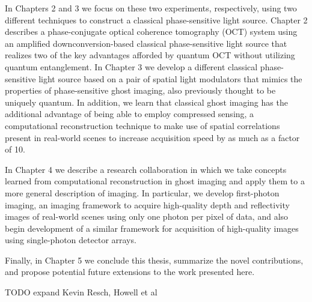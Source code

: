 In Chapters 2 and 3 we focus on these two experiments, respectively, using two different techniques to construct a classical phase-sensitive light source. Chapter 2 describes a phase-conjugate optical coherence tomography (OCT) system using an amplified downconversion-based classical phase-sensitive light source that realizes two of the key advantages afforded by quantum OCT without utilizing quantum entanglement. In Chapter 3 we develop a different classical phase-sensitive light source based on a pair of spatial light modulators that mimics the properties of phase-sensitive ghost imaging, also previously thought to be uniquely quantum. In addition, we learn that classical ghost imaging has the additional advantage of being able to employ compressed sensing, a computational reconstruction technique to make use of spatial correlations present in real-world scenes to increase acquisition speed by as much as a factor of 10.

In Chapter 4 we describe a research collaboration in which we take concepts learned from computational reconstruction in ghost imaging and apply them to a more general description of imaging. In particular, we develop first-photon imaging, an imaging framework to acquire high-quality depth and reflectivity images of real-world scenes using only one photon per pixel of data, and also begin development of a similar framework for acquisition of high-quality images using single-photon detector arrays.

Finally, in Chapter 5 we conclude this thesis, summarize the novel contributions, and propose potential future extensions to the work presented here.

TODO expand Kevin Resch, Howell et al
